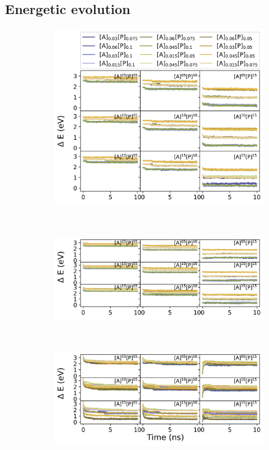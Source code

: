 \subsection{Energetic evolution}

\begin{figure}
\centering
\begin{subfigure}[b]{0.8\textwidth}
    \includegraphics[width=\textwidth]{figures/MD/Env/CS1_EDelta.jpeg}
\end{subfigure}\\
\begin{subfigure}[b]{0.8\textwidth}
    \includegraphics[width=\textwidth]{figures/MD/Env/CS2_EDelta.jpeg}
    \end{subfigure}\\
\begin{subfigure}[b]{0.8\textwidth}
    \includegraphics[width=\textwidth]{figures/MD/Env/CS3_EDelta.jpeg}

\end{subfigure}
\end{figure}
